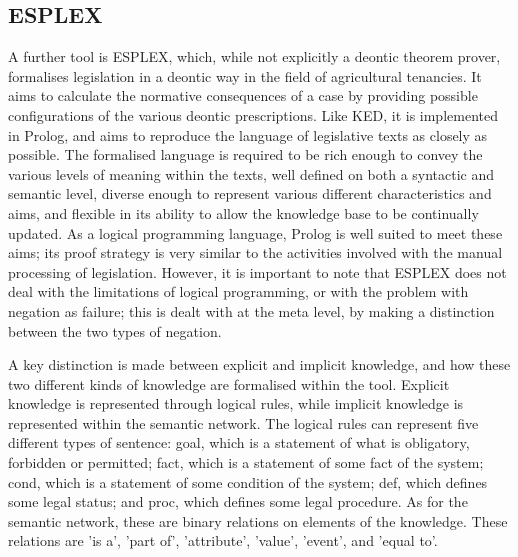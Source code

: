 \documentclass{l4proj}
\begin{document}

\subsection{ESPLEX}
A further tool is ESPLEX, which, while not explicitly a deontic theorem prover, formalises legislation in a deontic way in the field of agricultural tenancies\cite{ESPLEX}. It aims to calculate the normative consequences of a case by providing possible configurations of the various deontic prescriptions. Like KED, it is implemented in Prolog, and aims to reproduce the language of legislative texts as closely as possible. The formalised language is required to be rich enough to convey the various levels of meaning within the texts, well defined on both a syntactic and semantic level, diverse enough to represent various different characteristics and aims, and flexible in its ability to allow the knowledge base to be continually updated. As a logical programming language, Prolog is well suited to meet these aims; its proof strategy is very similar to the activities involved with the manual processing of legislation. However, it is important to note that ESPLEX does not deal with the limitations of logical programming, or with the problem with negation as failure; this is dealt with at the meta level, by making a distinction between the two types of negation. 

A key distinction is made between explicit and implicit knowledge, and how these two different kinds of knowledge are formalised within the tool. Explicit knowledge is represented through logical rules, while implicit knowledge is represented within the semantic network. The logical rules can represent five different types of sentence: goal, which is a statement of what is obligatory, forbidden or permitted; fact, which is a statement of some fact of the system; cond, which is a statement of some condition of the system; def, which defines some legal status; and proc, which defines some legal procedure. As for the semantic network, these are binary relations on elements of the knowledge. These relations are 'is a', 'part of', 'attribute', 'value', 'event', and 'equal to'. 
\end{document}
